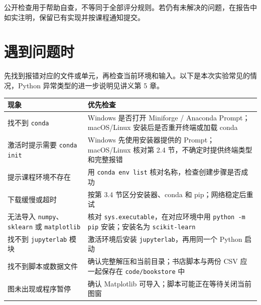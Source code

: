 \documentclass[UTF8,a4paper,11pt,fontset=fandol]{ctexart}
\providecommand{\passthrough}[1]{#1}
\begin{document}
公开检查用于帮助自查，不等同于全部评分规则。若仍有未解决的问题，在报告中如实注明，保留已有实现并按课程通知提交。

\clearpage

\section{遇到问题时}\label{ux9047ux5230ux95eeux9898ux65f6}

先找到报错对应的文件或单元，再检查当前环境和输入。以下是本次实验常见的情况，Python 异常类型的进一步说明见讲义第 5 章。

\begin{longtable}[]{@{}
  >{\raggedright\arraybackslash}p{}
  >{\raggedright\arraybackslash}p{}@{}}
\toprule\noalign{}
\begin{minipage}[b]{\linewidth}\raggedright
现象
\end{minipage} & \begin{minipage}[b]{\linewidth}\raggedright
优先检查
\end{minipage} \\
\midrule\noalign{}
\endhead
\bottomrule\noalign{}
\endlastfoot
找不到 \passthrough{\lstinline!conda!} & Windows 是否打开 Miniforge / Anaconda Prompt；macOS/Linux 安装后是否重开终端或加载 conda \\
激活时提示需要 \passthrough{\lstinline!conda init!} & Windows 先使用安装器提供的 Prompt；macOS/Linux 核对第 2.4 节，不确定时提供终端类型和完整报错 \\
提示课程环境不存在 & 用 \passthrough{\lstinline!conda env list!} 核对名称，检查创建步骤是否成功 \\
下载缓慢或超时 & 按第 3.4 节区分安装器、conda 和 pip；网络稳定后重试 \\
无法导入 \passthrough{\lstinline!numpy!}、\passthrough{\lstinline!sklearn!} 或 \passthrough{\lstinline!matplotlib!} & 核对 \passthrough{\lstinline!sys.executable!}，在对应环境中用 \passthrough{\lstinline!python -m pip!} 安装；安装名为 \passthrough{\lstinline!scikit-learn!} \\
找不到 \passthrough{\lstinline!jupyterlab!} 模块 & 激活环境后安装 \passthrough{\lstinline!jupyterlab!}，再用同一个 Python 启动 \\
找不到脚本或数据文件 & 确认完整解压和当前目录；书店脚本与两份 CSV 应一起保存在 \passthrough{\lstinline!code/bookstore!} 中 \\
图未出现或程序暂停 & 确认 Matplotlib 可导入；脚本可能正在等待关闭当前图窗 \\

\end{longtable}
\end{document}
